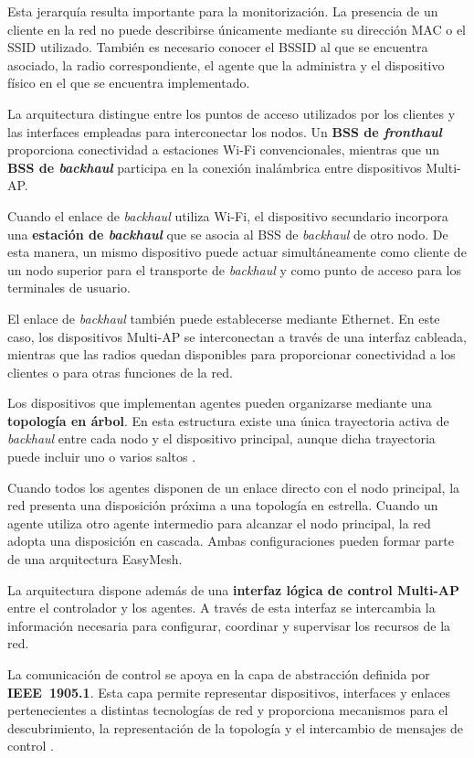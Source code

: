 Esta jerarquía resulta importante para la monitorización. La presencia de
un cliente en la red no puede describirse únicamente mediante su
dirección MAC o el SSID utilizado. También es necesario conocer el BSSID
al que se encuentra asociado, la radio correspondiente, el agente que la
administra y el dispositivo físico en el que se encuentra implementado.

La arquitectura distingue entre los puntos de acceso utilizados por los
clientes y las interfaces empleadas para interconectar los nodos. Un
\textbf{BSS de \textit{fronthaul}} proporciona conectividad a estaciones
Wi-Fi convencionales, mientras que un
\textbf{BSS de \textit{backhaul}} participa en la conexión inalámbrica
entre dispositivos Multi-AP.

Cuando el enlace de \textit{backhaul} utiliza Wi-Fi, el dispositivo
secundario incorpora una \textbf{estación de \textit{backhaul}} que se
asocia al BSS de \textit{backhaul} de otro nodo. De esta manera, un mismo
dispositivo puede actuar simultáneamente como cliente de un nodo superior
para el transporte de \textit{backhaul} y como punto de acceso para los
terminales de usuario.

El enlace de \textit{backhaul} también puede establecerse mediante
Ethernet. En este caso, los dispositivos Multi-AP se interconectan a
través de una interfaz cableada, mientras que las radios quedan
disponibles para proporcionar conectividad a los clientes o para otras
funciones de la red.

Los dispositivos que implementan agentes pueden organizarse mediante una
\textbf{topología en árbol}. En esta estructura existe una única
trayectoria activa de \textit{backhaul} entre cada nodo y el dispositivo
principal, aunque dicha trayectoria puede incluir uno o varios saltos
\cite{wifi_alliance_easymesh}.

Cuando todos los agentes disponen de un enlace directo con el nodo
principal, la red presenta una disposición próxima a una topología en
estrella. Cuando un agente utiliza otro agente intermedio para alcanzar
el nodo principal, la red adopta una disposición en cascada. Ambas
configuraciones pueden formar parte de una arquitectura EasyMesh.

La arquitectura dispone además de una
\textbf{interfaz lógica de control Multi-AP} entre el controlador y los
agentes. A través de esta interfaz se intercambia la información
necesaria para configurar, coordinar y supervisar los recursos de la
red.

La comunicación de control se apoya en la capa de abstracción definida
por \textbf{IEEE~1905.1}. Esta capa permite representar dispositivos,
interfaces y enlaces pertenecientes a distintas tecnologías de red y
proporciona mecanismos para el descubrimiento, la representación de la
topología y el intercambio de mensajes de control
\cite{ieee_1905_1}.


